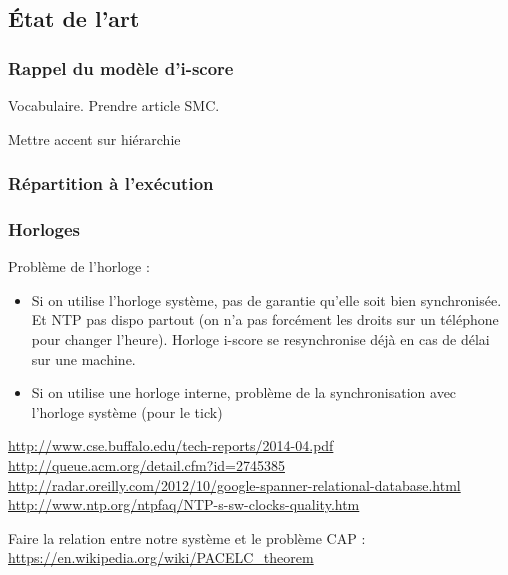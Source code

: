 \documentclass{article}
\newcommand\trigger{point d'interaction\xspace}
\begin{document}

\subsection{État de l'art}
\subsubsection{Rappel du modèle d'i-score}
\cite{celerier2015ossia}
Vocabulaire. Prendre article SMC.

Mettre accent sur hiérarchie
\subsubsection{Répartition à l'exécution}


\subsubsection{Horloges}
Problème de l'horloge : 
\begin{itemize}
\item Si on utilise l'horloge système, pas de garantie qu'elle soit bien synchronisée. 
Et NTP pas dispo partout (on n'a pas forcément les droits sur un téléphone pour changer l'heure).
Horloge i-score se resynchronise déjà en cas de délai sur une machine.
\item Si on utilise une horloge interne, problème de la synchronisation avec l'horloge système (pour le tick)
\end{itemize}
\url{http://www.cse.buffalo.edu/tech-reports/2014-04.pdf}
\url{http://queue.acm.org/detail.cfm?id=2745385}
\url{http://radar.oreilly.com/2012/10/google-spanner-relational-database.html}
\url{http://www.ntp.org/ntpfaq/NTP-s-sw-clocks-quality.htm}

Faire la relation entre notre système et le problème CAP : \url{https://en.wikipedia.org/wiki/PACELC_theorem}
\end{document}
